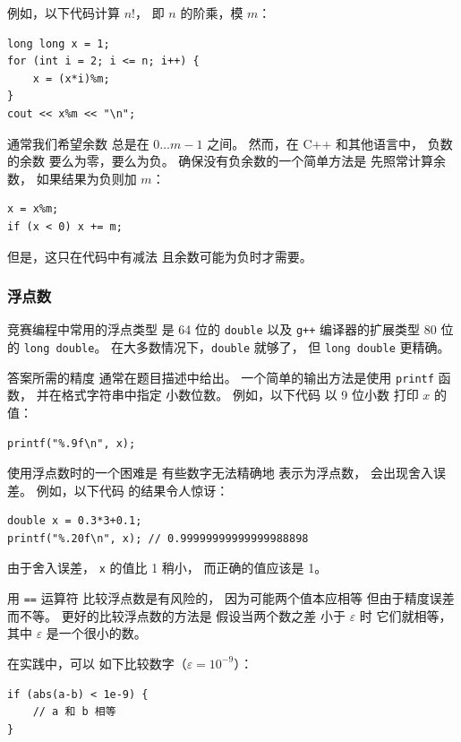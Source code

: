 例如，以下代码计算 $n!$，
即 $n$ 的阶乘，模 $m$：
\begin{lstlisting}
long long x = 1;
for (int i = 2; i <= n; i++) {
    x = (x*i)%m;
}
cout << x%m << "\n";
\end{lstlisting}

通常我们希望余数
总是在 $0\ldots m-1$ 之间。
然而，在 C++ 和其他语言中，
负数的余数
要么为零，要么为负。
确保没有负余数的一个简单方法是
先照常计算余数，
如果结果为负则加 $m$：
\begin{lstlisting}
x = x%m;
if (x < 0) x += m;
\end{lstlisting}
但是，这只在代码中有减法
且余数可能为负时才需要。

\subsubsection{浮点数}


竞赛编程中常用的浮点类型
是 64 位的 \texttt{double}
以及 \texttt{g++} 编译器的扩展类型
80 位的 \texttt{long double}。
在大多数情况下，\texttt{double} 就够了，
但 \texttt{long double} 更精确。

答案所需的精度
通常在题目描述中给出。
一个简单的输出方法是使用
\texttt{printf} 函数，
并在格式字符串中指定
小数位数。
例如，以下代码
以 9 位小数
打印 $x$ 的值：

\begin{lstlisting}
printf("%.9f\n", x);
\end{lstlisting}

使用浮点数时的一个困难是
有些数字无法精确地
表示为浮点数，
会出现舍入误差。
例如，以下代码
的结果令人惊讶：

\begin{lstlisting}
double x = 0.3*3+0.1;
printf("%.20f\n", x); // 0.99999999999999988898
\end{lstlisting}

由于舍入误差，
\texttt{x} 的值比 1 稍小，
而正确的值应该是 1。

用 \texttt{==} 运算符
比较浮点数是有风险的，
因为可能两个值本应相等
但由于精度误差而不等。
更好的比较浮点数的方法是
假设当两个数之差
小于 $\varepsilon$ 时
它们就相等，
其中 $\varepsilon$ 是一个很小的数。

在实践中，可以
如下比较数字（$\varepsilon=10^{-9}$）：

\begin{lstlisting}
if (abs(a-b) < 1e-9) {
    // a 和 b 相等
}
\end{lstlisting}

